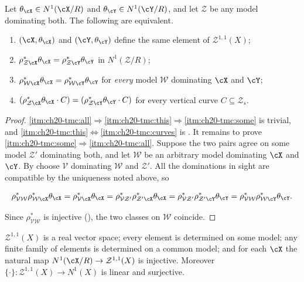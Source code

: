 \begin{proposition}
\label{prop:ch20-two-model-comparison}
Let $\theta_{\cX}\in N^1(\cX/R)$ and $\theta_{\cY}\in N^1(\cY/R)$, and
let $\mathcal Z$ be any model dominating both.  The following are equivalent.
\begin{enumerate}
\item\label{itm:ch20-tmc:some} $(\cX,\theta_{\cX})$ and
 $(\cY,\theta_{\cY})$ define the same element of $\mathcal Z^{1,1}(X)$;
\item\label{itm:ch20-tmc:this}
 $\rho_{\mathcal Z\cX}^*\theta_{\cX}=\rho_{\mathcal Z\cY}^*\theta_{\cY}$ in
 $N^1(\mathcal Z/R)$;
\item\label{itm:ch20-tmc:all}
 $\rho_{\mathcal W\cX}^*\theta_{\cX}=\rho_{\mathcal W\cY}^*\theta_{\cY}$ for
 \emph{every} model $\mathcal W$ dominating $\cX$ and $\cY$;
\item\label{itm:ch20-tmc:curves}
 $(\rho_{\mathcal Z\cX}^*\theta_{\cX}\cdot C)
   =(\rho_{\mathcal Z\cY}^*\theta_{\cY}\cdot C)$ for every vertical curve
 $C\subseteq\mathcal Z_s$.
\end{enumerate}
\end{proposition}

\begin{proof}
\cref{itm:ch20-tmc:all}$\Rightarrow$\cref{itm:ch20-tmc:this}$\Rightarrow$\cref{itm:ch20-tmc:some}
is trivial, and \cref{itm:ch20-tmc:this}$\Leftrightarrow$\cref{itm:ch20-tmc:curves}
is .  It remains to prove
\cref{itm:ch20-tmc:some}$\Rightarrow$\cref{itm:ch20-tmc:all}.  Suppose the
two pairs agree on some model $\mathcal Z'$ dominating both, and let $\mathcal W$ be
an arbitrary model dominating $\cX$ and $\cY$.  By
 choose $\mathcal V$ dominating $\mathcal W$ and
$\mathcal Z'$.  All the dominations in sight are compatible by the uniqueness
noted above, so

\[
 \rho_{\mathcal V\mathcal W}^*\rho_{\mathcal W\cX}^*\theta_{\cX}
 =\rho_{\mathcal V\cX}^*\theta_{\cX}
 =\rho_{\mathcal V\mathcal Z'}^*\rho_{\mathcal Z'\cX}^*\theta_{\cX}
 =\rho_{\mathcal V\mathcal Z'}^*\rho_{\mathcal Z'\cY}^*\theta_{\cY}
 =\rho_{\mathcal V\mathcal W}^*\rho_{\mathcal W\cY}^*\theta_{\cY}.
\]

Since $\rho_{\mathcal V\mathcal W}^*$ is injective
(), the two classes on $\mathcal W$ coincide.
\end{proof}

\begin{corollary}
\label{cor:ch20-limit-structure}
$\mathcal Z^{1,1}(X)$ is a real vector space; every element is determined on some
model; any finite family of elements is determined on a common model; and
for each $\cX$ the natural map $N^1(\cX/R)\to\mathcal Z^{1,1}(X)$ is injective.
Moreover $\{\cdot\}:\mathcal Z^{1,1}(X)\to N^1(X)$ is linear and surjective.
\end{corollary}

